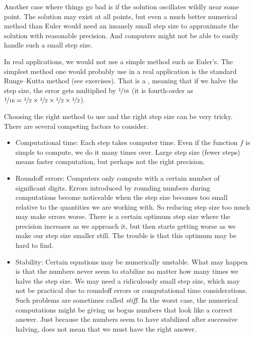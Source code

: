 Another case where things go bad is if the solution oscillates wildly
near some point.
The solution
may exist at all points, but even a much better numerical method than
Euler would need an insanely small step size to approximate the solution
with reasonable precision.
And computers might not be able to easily handle such a small step size.

\medskip

In real applications, we would not use a simple method such as Euler's.  The
simplest method one would probably use in a real application is the
standard Runge--Kutta method (see exercises).  That is a
,
meaning that if we halve the step size,
the error gets multiplied by $\nicefrac{1}{16}$
(it is fourth-order as $\nicefrac{1}{16} =
\nicefrac{1}{2} \times \nicefrac{1}{2}
\times \nicefrac{1}{2} \times \nicefrac{1}{2}$).

Choosing the right method to use and the right step size can be very tricky.
There are several competing factors to consider.
\begin{itemize}
\item Computational time:  Each step takes computer time.  Even if the
function $f$ is simple to compute, we do it many times over.
Large step size (fewer steps) means faster computation, but perhaps not
the right precision.
\item Roundoff errors: Computers only compute with a certain number of
significant digits.  Errors introduced by rounding numbers during
computations become noticeable when the step size becomes
too small relative to the quantities we are working with.
So reducing
step size too much may make errors worse.
There is a certain optimum step size
where the precision increases as we approach it, but then starts getting
worse as we make our step size
smaller still.  The trouble is that this optimum may be hard to find.
\item Stability: Certain equations may be numerically unstable.  What may
happen is that the numbers never seem to stabilize no matter how many times
we halve the step size.  We may need a ridiculously small step size,
which may not be practical due to roundoff errors or computational time
considerations.  Such problems are sometimes called
\emph{stiff}.
In the worst case, the numerical computations might be
giving us bogus numbers that look like a correct answer.  Just because the
numbers seem to have stabilized after successive halving, does not mean that we must
have the right answer.
\end{itemize}

